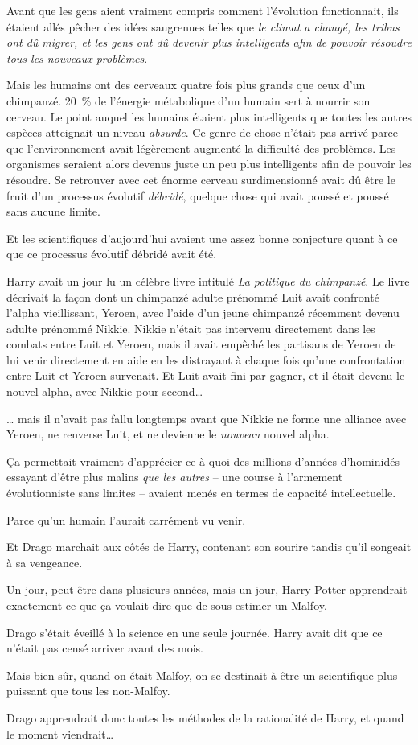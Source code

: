 Avant que les gens aient vraiment compris comment l'évolution fonctionnait, ils étaient allés pêcher des idées saugrenues telles que \emph{le climat a changé, les tribus ont dû migrer, et les gens ont dû devenir plus intelligents afin de pouvoir résoudre tous les nouveaux problèmes}.

Mais les humains ont des cerveaux quatre fois plus grands que ceux d'un chimpanzé. 20~\% de l'énergie métabolique d'un humain sert à nourrir son cerveau. Le point auquel les humains étaient plus intelligents que toutes les autres espèces atteignait un niveau \emph{absurde}. Ce genre de chose n'était pas arrivé parce que l'environnement avait légèrement augmenté la difficulté des problèmes. Les organismes seraient alors devenus juste un peu plus intelligents afin de pouvoir les résoudre. Se retrouver avec cet énorme cerveau surdimensionné avait dû être le fruit d'un processus évolutif \emph{débridé}, quelque chose qui avait poussé et poussé sans aucune limite.

Et les scientifiques d'aujourd'hui avaient une assez bonne conjecture quant à ce que ce processus évolutif débridé avait été.

Harry avait un jour lu un célèbre livre intitulé \emph{La politique du chimpanzé}. Le livre décrivait la façon dont un chimpanzé adulte prénommé Luit avait confronté l'alpha vieillissant, Yeroen, avec l'aide d'un jeune chimpanzé récemment devenu adulte prénommé Nikkie. Nikkie n'était pas intervenu directement dans les combats entre Luit et Yeroen, mais il avait empêché les partisans de Yeroen de lui venir directement en aide en les distrayant à chaque fois qu'une confrontation entre Luit et Yeroen survenait. Et Luit avait fini par gagner, et il était devenu le nouvel alpha, avec Nikkie pour second…

… mais il n'avait pas fallu longtemps avant que Nikkie ne forme une alliance avec Yeroen, ne renverse Luit, et ne devienne le \emph{nouveau} nouvel alpha.

Ça permettait vraiment d'apprécier ce à quoi des millions d'années d'hominidés essayant d'être plus malins \emph{que les autres} -- une course à l'armement évolutionniste sans limites -- avaient menés en termes de capacité intellectuelle.

Parce qu'un humain l'aurait carrément vu venir.

\later

Et Drago marchait aux côtés de Harry, contenant son sourire tandis qu'il songeait à sa vengeance.

Un jour, peut-être dans plusieurs années, mais un jour, Harry Potter apprendrait exactement ce que ça voulait dire que de sous-estimer un Malfoy.

Drago s'était éveillé à la science en une seule journée. Harry avait dit que ce n'était pas censé arriver avant des mois.

Mais bien sûr, quand on était Malfoy, on se destinait à être un scientifique plus puissant que tous les non-Malfoy.

Drago apprendrait donc toutes les méthodes de la rationalité de Harry, et quand le moment viendrait…
